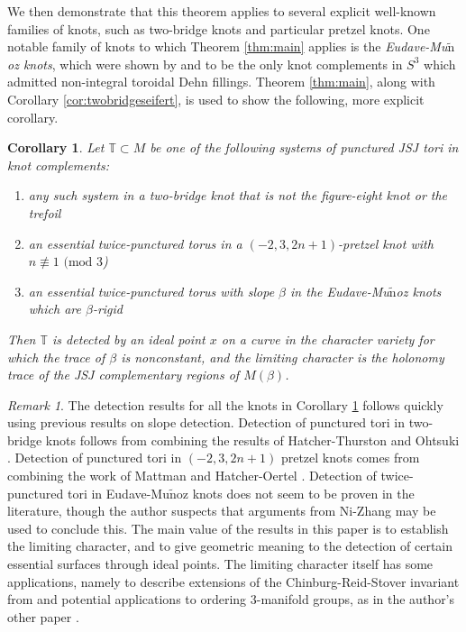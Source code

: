 \documentclass{article}
\theoremstyle{plain}
\theoremstyle{definition}
\theoremstyle{plain}
\theoremstyle{plain}
\newtheorem{corollary}[theorem]{Corollary}
\theoremstyle{plain}
\theoremstyle{remark}
\newtheorem{remark}[theorem]{Remark}
\theoremstyle{remark}
\theoremstyle{plain}
\theoremstyle{plain}
\begin{document}
\medskip

We then demonstrate that this theorem applies to several explicit well-known families of knots, such as two-bridge knots and particular pretzel knots. One notable family of knots to which Theorem \ref{thm:main} applies is the \emph{Eudave-Mu$\tilde{\text{n}}$oz knots}, which were shown by \cite{eudavemunoz} and \cite{gordonleucke} to be the only knot complements in $S^3$ which admitted non-integral toroidal Dehn fillings. Theorem \ref{thm:main}, along with Corollary \ref{cor:twobridgeseifert}, is used to show the following, more explicit corollary.

\begin{corollary}\label{cor:examples}
Let $\mathbb{T} \subset M$ be one of the following systems of punctured JSJ tori in knot complements:
\begin{enumerate}
	\item any such system in a two-bridge knot that is not the figure-eight knot or the trefoil
	\item an essential twice-punctured torus in a $(-2, 3, 2n+1)$-pretzel knot with $n \not\equiv 1 \text{ (mod } 3$)
	\item an essential twice-punctured torus with slope $\beta$ in the Eudave-Mu$\tilde{\text{n}}$oz knots which are $\beta$-rigid
\end{enumerate} 
Then $\mathbb{T}$ is detected by an ideal point $x$ on a curve in the character variety for which the trace of $\beta$ is nonconstant, and the limiting character is the holonomy trace of the JSJ complementary regions of $M(\beta)$. 
\end{corollary}

\begin{remark}\label{rmk:known}
The detection results for all the knots in Corollary \ref{cor:examples} follows quickly using previous results on slope detection. Detection of punctured tori in two-bridge knots follows from combining the results of Hatcher-Thurston \cite{Hatcher1985IncompressibleSI} and Ohtsuki \cite{ohtsuki}. Detection of punctured tori in $(-2, 3, 2n+1)$ pretzel knots comes from combining the work of Mattman \cite{Mattman} and Hatcher-Oertel \cite{hatcheroertel}. Detection of twice-punctured tori in Eudave-Mu$\tilde{\text{n}}$oz knots does not seem to be proven in the literature, though the author suspects that arguments from Ni-Zhang \cite{nizhang} may be used to conclude this. The main value of the results in this paper is to establish the limiting character, and to give geometric meaning to the detection of certain essential surfaces through ideal points. The limiting character itself has some applications, namely to describe extensions of the Chinburg-Reid-Stover invariant from \cite{Chinburg2017AzumayaAA} and potential applications to ordering 3-manifold groups, as in the author's other paper \cite{orderability}. 
\end{remark}
\end{document}

